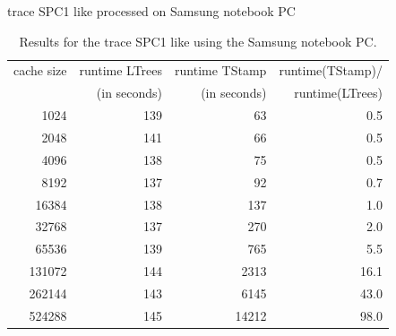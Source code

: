 \documentclass[a4paper,12pt, titlepage]{article}  %
\begin{document}
\begin{table}[p]
\begin{center}
	trace SPC1 like processed on Samsung notebook PC
	\begin{tabular}{|r||r|r|r|}
	  	\hline
                cache size                               &     runtime LTrees         &      runtime TStamp          &  runtime(TStamp)/ \\
                                                             &      (in seconds)            &      (in seconds)                 & runtime(LTrees)     \\
                \hline
                1024			             &           139                   &                63                    &         0.5               \\
		2048					     &        141                      &        66                            &     0.5                   \\								
		4096					     &        138                      &        75                            &      0.5                  \\	
		8192					     &        137                      &        92                            &      0.7                  \\	
		16384				     &        138                      &       137                            &      1.0                  \\	
		32768				     &        137                      &       270                             &     2.0                   \\	
		65536				     &        139                      &       765                              &    5.5                    \\	
		131072				     &        144                      &       2313                             &     16.1                   \\	
		262144				     &        143                      &       6145                             &      43.0                  \\	
		524288				     &        145                      &      14212                              &      98.0                  \\
                \hline
	\end{tabular}
	\caption{Results for the trace SPC1 like using the Samsung notebook PC.}
        \label{tab:samsung_SPC1}
\end{center}
\end{table}
\end{document}
